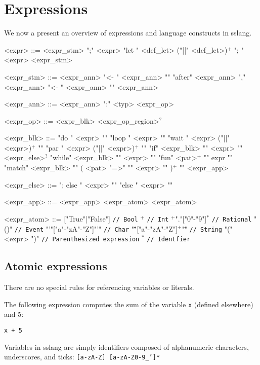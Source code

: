 \documentclass{article}
\begin{document}
\section{Expressions}
We now a present an overview of expressions and language constructs in sslang.
\begin{grammar}
<expr> ::= <expr_stm> ";" <expr>
\alt "let {" <def_let> ("||" <def_let>)$^{+}$ "}; " <expr>
\alt <expr_stm>

<expr_stm> ::= <expr_ann> "<- {"  <expr_ann> "}"
\alt "after" <expr_ann> "," <expr_ann> "<- {"  <expr_ann> "}"
\alt <expr_ann>

<expr_ann> ::= <expr_ann> ":" <typ>
\alt <expr_op>

<expr_op> ::= <expr_blk> <expr_op_region>$^{?}$

<expr_blk> ::=  "do {" <expr> "}"
\alt "loop {" <expr> "}"
\alt "wait {" <expr> ("||" <expr>)$^{+}$ "}"
\alt "par {" <expr> ("||" <expr>)$^{+}$ "}"
\alt "if" <expr_blk> "{" <expr> "}" <expr_else>$^{?}$
\alt "while" <expr_blk> "{" <expr> "}"
\alt "fun" <pat>$^{+}$ "{" expr "}"
\alt "match" <expr_blk> "{" (  <pat> "=>" "{" <expr> "}" )$^{+}$ "}"
\alt <expr_app>

<expr_else> ::= "; else {" <expr> "}"
\alt "else {" <expr> "}"

<expr_app> ::= <expr_app> <expr_atom>
\alt <expr_atom>

<expr_atom> ::= ["True"|"False"] \texttt{// Bool}
\alt ["0"-"9"]$^{+}$ \texttt{// Int}
\alt ["0"-"9"]$^{+}$"."["0"-"9"]$^{*}$ \texttt{// Rational}
\alt "()" \texttt{// Event}
\alt "'"["a"-"zA"-"Z"]"'" \texttt{// Char}
\alt "\""["a"-"zA"-"Z"]$^{+}$"\"" \texttt{// String}
\alt "(" <expr> ")" \texttt{// Parenthesized expression}
\alt ["a"-"zA"-"Z"] ["a"-"zA"-"Z0"-"9_'"]$^{*}$ \texttt{// Identfier}
\end{grammar}
\subsection{Atomic expressions}
There are no special rules for referencing variables or literals.

The following expression computes the sum of the variable \texttt{x} (defined elsewhere) and 5:
\begin{lstlisting}
x + 5
\end{lstlisting}
Variables in sslang are simply identifiers composed of alphanumeric characters, underscores, and ticks: \texttt{[a-zA-Z] [a-zA-Z0-9_']*}
\end{document}
